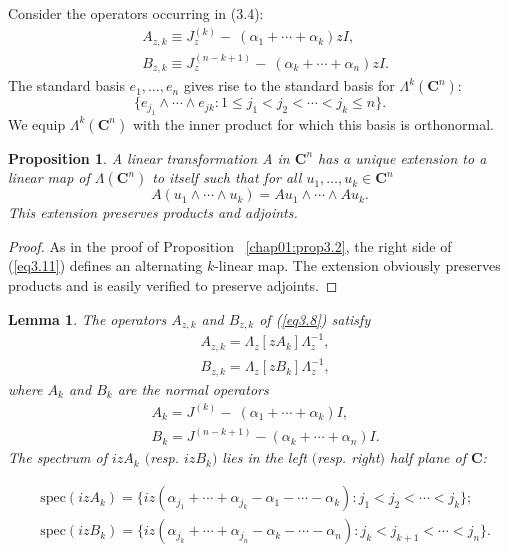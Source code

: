 \documentclass{surv-l}
\theoremstyle{plain}
\newtheorem{prop}[theorem]{Proposition}
\newtheorem{lemma}[theorem]{Lemma}
\theoremstyle{definition}
\numberwithin{equation}{chapter}
\begin{document}
Consider the operators occurring in (3.4):
\begin{align}\label{eq3.8}
&A_{z,k}\equiv J_{z}^{(k)}-\ (\alpha_{1}+\cdots +\alpha_{k})zI,\\ \nonumber
&B_{z,k}\equiv J_{z}^{(n-k+1)}-\ (\alpha_{k}+\cdots +\alpha_{n})zI.
\end{align}
The standard basis $e_{1},\ldots,e_{n}$ gives rise to the standard basis for $\Lambda^{k}(\mathbf{C}^{n})$:
\begin{equation}\label{eq3.9}
\{e_{j_{1}}\wedge\cdots\wedge e_{jk}:1\leq j_{1}< j_{2}<\cdots <j_{k}\leq n\}.
\end{equation}
We equip $\Lambda^{k}(\mathbf{C}^{n})$ with the inner product for which this basis is orthonormal.
\setcounter{theorem}{9}
\begin{prop}\label{chap01:prop3.10}
A linear transformation A in $\mathbf{C}^{n}$ has a unique extension to a linear map of $\Lambda(\mathbf{C}^{n})$ to itself such that for all $ u_{1},\ldots, u_{k}\in \mathbf{C}^{n}$
\setcounter{equation}{10}
\begin{equation}\label{eq3.11}
A(u_{1}\wedge\cdots\wedge u_{k})=Au_{1}\wedge\cdots\wedge Au_{k}.
\end{equation}
This extension preserves products and adjoints.
\end{prop}

\begin{proof}
As in the proof of Proposition ~\ref{chap01:prop3.2}, the right side of (\ref{eq3.11}) defines an alternating $k$-linear map. The extension obviously preserves products and is easily verified to preserve adjoints.
\end{proof}
\setcounter{theorem}{11}
\begin{lemma}\label{chap01:lem3.12}
The operators $A_{z,k}$ and $B_{z,k}$ of \emph{(\ref{eq3.8})} satisfy
\setcounter{equation}{12}
\begin{align}\label{eq3.13}
&A_{z,k}=\Lambda_{z}[zA_{k}]\Lambda_{z}^{-1},\\ \nonumber
&B_{z,k}=\Lambda_{z}[zB_{k}]\Lambda_{z}^{-1},
\end{align}
where $A_{k}$ and $B_{k}$ are the normal operators
\begin{align}\label{eq3.14}
&A_{k}=J^{(k)}-\ (\alpha_{1}+\cdots +\alpha_{k})I, \\ \nonumber
&B_{k}=J^{(n-k+1)}-(\alpha_{k}+\cdots +\alpha_{n})I.
\end{align}
The spectrum of $izA_{k}$ $($resp. $izB_{k})$ lies in the left $($resp. right$)$ half plane of $\mathbf{C}$\emph{:}
\end{lemma}
\begin{align}\label{eq3.15}
&\mathrm{spec}(izA_{k})=\{iz(\alpha_{j_{1}}+\cdots +\alpha_{j_{k}}-\alpha_{1}-\cdots -\alpha_{k}):j_{1}<j_{2}<\cdots <j_{k}\}; \\ \nonumber
&\mathrm{spec}(izB_{k})=\{iz(\alpha_{j_{k}}+\cdots+\alpha_{j_{n}}-\alpha_{k}-\cdots-\alpha_{n}):j_{k}<j_{k+1}<\cdots<j_{n}\}.
\end{align}
\end{document}
